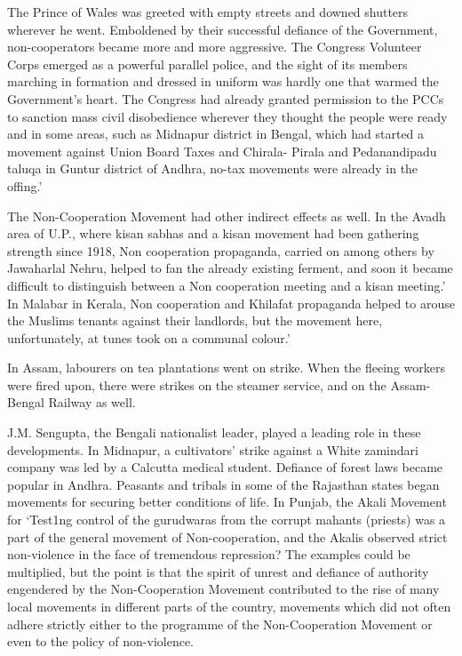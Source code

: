 The Prince of Wales was greeted with empty streets and downed shutters wherever he went. Emboldened by their successful defiance of the Government, non-cooperators became more and more aggressive. The Congress Volunteer Corps emerged as a powerful parallel police, and the sight of its members marching in formation and dressed in uniform was hardly one that warmed the Government’s heart. The Congress had already granted permission to the PCCs to sanction mass civil disobedience wherever they thought the people were ready and in some areas, such as Midnapur district in Bengal, which had started a movement against Union Board Taxes and Chirala- Pirala and Pedanandipadu taluqa in Guntur district of Andhra, no-tax movements were already in the offing.’ 

The Non-Cooperation Movement had other indirect effects as well. In the Avadh area of U.P., where kisan sabhas and a kisan movement had been gathering strength since 1918, Non­ cooperation propaganda, carried on among others by Jawaharlal Nehru, helped to fan the already existing ferment, and soon it became difficult to distinguish between a Non cooperation meeting and a kisan meeting.’ In Malabar in Kerala, Non cooperation and Khilafat propaganda helped to arouse the Muslims tenants against their landlords, but the movement here, unfortunately, at tunes took on a communal colour.’ 

In Assam, labourers on tea plantations went on strike. When the fleeing workers were fired upon, there were strikes on the steamer service, and on the Assam-Bengal Railway as well. 

J.M. Sengupta, the Bengali nationalist leader, played a leading role in these developments. In Midnapur, a cultivators’ strike against a White zamindari company was led by a Calcutta medical student. Defiance of forest laws became popular in Andhra. Peasants and tribals in some of the Rajasthan states began movements for securing better conditions of life. In Punjab, the Akali Movement for ‘Test1ng control of the gurudwaras from the corrupt mahants (priests) was a part of the general movement of Non-cooperation, and the Akalis observed strict non-violence in the face of tremendous repression? The examples could be multiplied, but the point is that the spirit of unrest and defiance of authority engendered by the Non-Cooperation Movement contributed to the rise of many local movements in different parts of the country, movements which did not often adhere strictly either to the programme of the Non-Cooperation Movement or even to the policy of non-violence.


